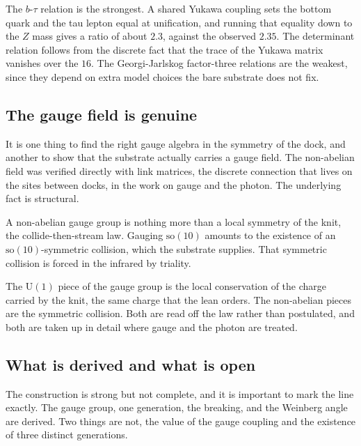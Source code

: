 The $b$-$\tau$ relation is the strongest. A shared Yukawa coupling sets the bottom quark and the tau lepton equal at unification, and running that equality down to the $Z$ mass gives a ratio of about $2.3$, against the observed $2.35$. The determinant relation follows from the discrete fact that the trace of the Yukawa matrix vanishes over the $16$. The Georgi-Jarlskog factor-three relations are the weakest, since they depend on extra model choices the bare substrate does not fix.

\subsection{The gauge field is genuine}

It is one thing to find the right gauge algebra in the symmetry of the dock, and another to show that the substrate actually carries a gauge field. The non-abelian field was verified directly with link matrices, the discrete connection that lives on the sites between docks, in the work on gauge and the photon. The underlying fact is structural.

\begin{principle}
A non-abelian gauge group is nothing more than a local symmetry of the knit, the collide-then-stream law. Gauging $\mathrm{so}(10)$ amounts to the existence of an $\mathrm{so}(10)$-symmetric collision, which the substrate supplies. That symmetric collision is forced in the infrared by triality.
\end{principle}

The $\mathrm{U}(1)$ piece of the gauge group is the local conservation of the charge carried by the knit, the same charge that the lean orders. The non-abelian pieces are the symmetric collision. Both are read off the law rather than postulated, and both are taken up in detail where gauge and the photon are treated.

\subsection{What is derived and what is open}

The construction is strong but not complete, and it is important to mark the line exactly. The gauge group, one generation, the breaking, and the Weinberg angle are derived. Two things are not, the value of the gauge coupling and the existence of three distinct generations.


